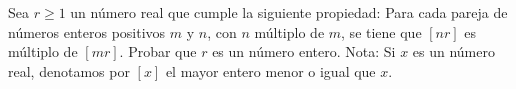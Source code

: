 Sea $r \geq 1$ un número real que cumple la siguiente propiedad:  \newline 
Para cada pareja de números enteros positivos $m$ y $n$, con $n$ múltiplo de $m$, se tiene que $[nr]$ es múltiplo de $[mr]$. Probar que $r$ es un número entero. \newline 
Nota: Si $x$ es un número real, denotamos por $[x]$ el mayor entero menor o igual que $x$.
